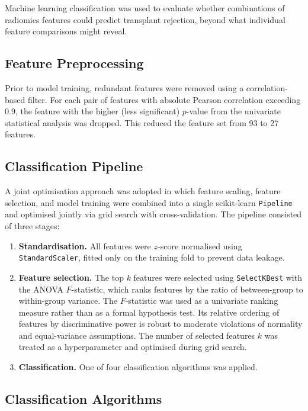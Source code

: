 Machine learning classification was used to evaluate whether combinations of radiomics features could predict transplant rejection, beyond what individual feature comparisons might reveal.

\subsection{Feature Preprocessing}

Prior to model training, redundant features were removed using a correlation-based filter. For each pair of features with absolute Pearson correlation exceeding 0.9, the feature with the higher (less significant) $p$-value from the univariate statistical analysis was dropped. This reduced the feature set from 93 to 27 features.

\subsection{Classification Pipeline}

A joint optimisation approach was adopted in which feature scaling, feature selection, and model training were combined into a single scikit-learn \texttt{Pipeline} and optimised jointly via grid search with cross-validation. The pipeline consisted of three stages:

\begin{enumerate}
\item \textbf{Standardisation.} All features were $z$-score normalised using \texttt{StandardScaler}, fitted only on the training fold to prevent data leakage.
\item \textbf{Feature selection.} The top $k$ features were selected using \texttt{SelectKBest} with the ANOVA $F$-statistic, which ranks features by the ratio of between-group to within-group variance. The $F$-statistic was used as a univariate ranking measure rather than as a formal hypothesis test. Its relative ordering of features by discriminative power is robust to moderate violations of normality and equal-variance assumptions. The number of selected features $k$ was treated as a hyperparameter and optimised during grid search.
\item \textbf{Classification.} One of four classification algorithms was applied.
\end{enumerate}

\subsection{Classification Algorithms}

